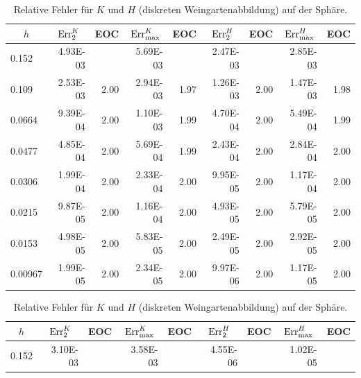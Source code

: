   
   \begin{table}[htbp]
      \centering
      \begin{tabular}{|l|r|r|r|r|r|r|r|r|}
      \hline
      \multicolumn{1}{|c|}{\( h \)} & \multicolumn{1}{c|}{\( \text{Err}_{2}^{K} \)} & \multicolumn{1}{c|}{EOC} & 
           \multicolumn{1}{c|}{\( \text{Err}_{\max}^{K} \)} & \multicolumn{1}{c|}{EOC} & \multicolumn{1}{c|}{\( \text{Err}_{2}^{H} \)} &
           \multicolumn{1}{c|}{EOC} & \multicolumn{1}{c|}{\( \text{Err}_{\max}^{H} \)} & \multicolumn{1}{c|}{EOC} \\ \hline
      0.152 & 4.93E-03 & \multicolumn{1}{l|}{} & 5.69E-03 & \multicolumn{1}{l|}{} & 2.47E-03 & \multicolumn{1}{l|}{} & 2.85E-03 & \multicolumn{1}{l|}{} \\ \hline
      0.109 & 2.53E-03 & 2.00 & 2.94E-03 & 1.97 & 1.26E-03 & 2.00 & 1.47E-03 & 1.98 \\ \hline
      0.0664 & 9.39E-04 & 2.00 & 1.10E-03 & 1.99 & 4.70E-04 & 2.00 & 5.49E-04 & 1.99 \\ \hline
      0.0477 & 4.85E-04 & 2.00 & 5.69E-04 & 1.99 & 2.43E-04 & 2.00 & 2.84E-04 & 2.00 \\ \hline
      0.0306 & 1.99E-04 & 2.00 & 2.33E-04 & 2.00 & 9.95E-05 & 2.00 & 1.17E-04 & 2.00 \\ \hline
      0.0215 & 9.87E-05 & 2.00 & 1.16E-04 & 2.00 & 4.93E-05 & 2.00 & 5.79E-05 & 2.00 \\ \hline
      0.0153 & 4.98E-05 & 2.00 & 5.83E-05 & 2.00 & 2.49E-05 & 2.00 & 2.92E-05 & 2.00 \\ \hline
      0.00967 & 1.99E-05 & 2.00 & 2.34E-05 & 2.00 & 9.97E-06 & 2.00 & 1.17E-05 & 2.00 \\ \hline
      \end{tabular}
      \caption[Weingarten auf der Sphäre]{Relative Fehler für \( K \) und \( H \) (diskreten Weingartenabbildung) auf der Sphäre.}
      \label{tabSphereWeingarten}
      \vspace{10pt}
      \begin{tabular}{|l|r|r|r|r|r|r|r|r|}
      \hline
      \multicolumn{1}{|c|}{\( h \)} & \multicolumn{1}{c|}{\( \text{Err}_{2}^{K} \)} & \multicolumn{1}{c|}{EOC} & 
           \multicolumn{1}{c|}{\( \text{Err}_{\max}^{K} \)} & \multicolumn{1}{c|}{EOC} & \multicolumn{1}{c|}{\( \text{Err}_{2}^{H} \)} &
           \multicolumn{1}{c|}{EOC} & \multicolumn{1}{c|}{\( \text{Err}_{\max}^{H} \)} & \multicolumn{1}{c|}{EOC} \\ \hline
           0.152 & 3.10E-03 & \multicolumn{1}{l|}{} & 3.58E-03 & \multicolumn{1}{l|}{} & 4.55E-06 & \multicolumn{1}{l|}{} & 1.02E-05 & \multicolumn{1}{l|}{} \\ \hline

\end{tabular}
\end{table}
